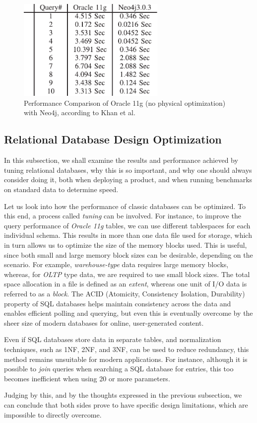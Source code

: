 \documentclass[10pt,        %
               a4paper,     %
               journal,     %
               ]{IEEEtran}
\begin{document}
\begin{figure}[!t]
	\centering
	\includegraphics[width=2.8in]{plots/no tuning table}
	\caption{Performance Comparison of Oracle 11g (no physical optimization) with Neo4j, according to Khan et al. \cite{IEEEpaper1:comparison}}
	\label{table_no_phys_vs_neo4j}
\end{figure}

\subsection{Relational Database Design Optimization}
In this subsection, we shall examine the results and performance achieved by tuning relational databases, why this is so important, and why one should always consider doing it, both when deploying a product, and when running benchmarks on standard data to determine speed. \par
Let us look into how the performance of classic databases can be optimized. To this end, a process called \textit{tuning} can be involved. For instance, to improve the query performance of \textit{Oracle 11g} tables, we can use different tablespaces for each individual schema.  This results in more than one data file used for storage, which in turn allows us to optimize the size of the memory blocks used. This is useful, since both small and large memory block sizes can be desirable, depending on the scenario. For example, \textit{warehouse-type} data requires large memory blocks, whereas, for \textit{OLTP} type data, we are required to use small block sizes. The total space allocation in a file is defined as an \textit{extent}, whereas one unit of I/O data is referred to as a \textit{block}. 
The ACID (Atomicity, Consistency Isolation, Durability) property of SQL databases helps maintain consistency across the data and enables efficient polling and querying, but even this is eventually overcome by the sheer size of modern databases for online, user-generated content. \par
Even if SQL databases store data in separate tables, and normalization techniques, such as 1NF, 2NF, and 3NF, can be used to reduce redundancy, this method remains unsuitable for modern applications. For instance, although it is possible to \textit{join} queries when searching a SQL database for entries, this too becomes inefficient when using 20 or more parameters. \par
Judging by this, and by the thoughts expressed in the previous subsection, we can conclude that both sides prove to have specific design limitations, which are impossible to directly overcome. \par
\end{document}

